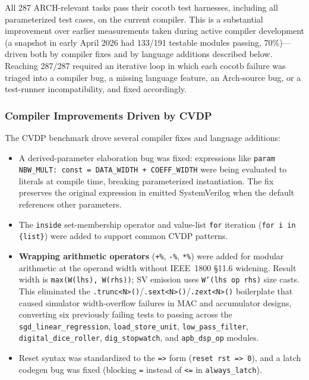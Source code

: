 \documentclass[manuscript]{acmart}
\begin{document}
All 287 ARCH-relevant tasks pass their cocotb test harnesses, including all parameterized test cases, on the current compiler. This is a substantial improvement over earlier measurements taken during active compiler development (a snapshot in early April 2026 had 133/191 testable modules passing, 70\%)---driven both by compiler fixes and by language additions described below. Reaching 287/287 required an iterative loop in which each cocotb failure was triaged into a compiler bug, a missing language feature, an Arch-source bug, or a test-runner incompatibility, and fixed accordingly.

\subsubsection{Compiler Improvements Driven by CVDP}

The CVDP benchmark drove several compiler fixes and language additions:

\begin{itemize}
\item A derived-parameter elaboration bug was fixed: expressions like \texttt{param NBW\_MULT: const = DATA\_WIDTH + COEFF\_WIDTH} were being evaluated to literals at compile time, breaking parameterized instantiation. The fix preserves the original expression in emitted SystemVerilog when the default references other parameters.
\item The \texttt{inside} set-membership operator and value-list \texttt{for} iteration (\texttt{for i in \{list\}}) were added to support common CVDP patterns.
\item \textbf{Wrapping arithmetic operators} (\texttt{+\%}, \texttt{-\%}, \texttt{*\%}) were added for modular arithmetic at the operand width without IEEE~1800 §11.6 widening. Result width is \texttt{max(W(lhs), W(rhs))}; SV emission uses \texttt{W'(lhs op rhs)} size casts. This eliminated the \texttt{.trunc<N>()}/\texttt{.sext<N>()}/\texttt{.zext<N>()} boilerplate that caused simulator width-overflow failures in MAC and accumulator designs, converting six previously failing tests to passing across the \texttt{sgd\_linear\_regression}, \texttt{load\_store\_unit}, \texttt{low\_pass\_filter}, \texttt{digital\_dice\_roller}, \texttt{dig\_stopwatch}, and \texttt{apb\_dsp\_op} modules.
\item Reset syntax was standardized to the \texttt{=>} form (\texttt{reset rst => 0}), and a latch codegen bug was fixed (blocking \texttt{=} instead of \texttt{<=} in \texttt{always\_latch}).
\end{itemize}
\end{document}
